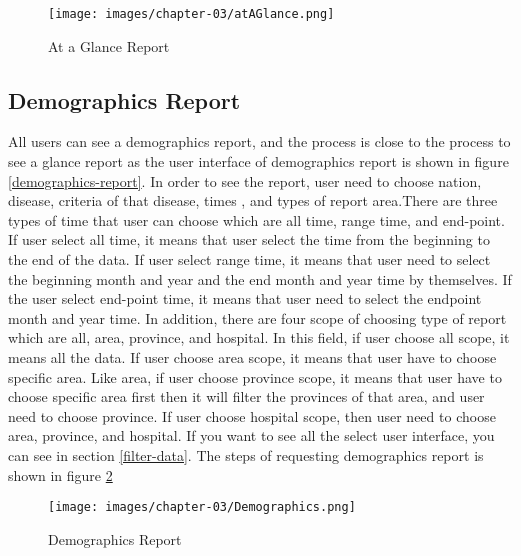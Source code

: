 	\FloatBarrier
    	\begin{figure}[h!]
            \centering
        		\texttt{[image: images/chapter-03/atAGlance.png]}
        		\caption{At a Glance Report}
        		\label{glance-report}
        \end{figure}
	\FloatBarrier
	
	\subsection{Demographics Report} \label{demographics_report_sec}
	All users can see a demographics report, and the process is close to the process to see a glance report as the user interface of demographics report is shown in figure \ref{demographics-report}. In order to see the report, user need to choose nation, disease, criteria of that disease, times , and types of report area.There are three types of time that user can choose which are all time, range time, and end-point. If user select all time, it means that user select the time from the beginning to the end of the data. If user select range time, it means that user need to select the beginning month and year and the end month and year time by themselves. If the user select end-point time, it means that user need to select the endpoint month and year time. In addition, there are four scope of choosing type of report which are all, area, province, and hospital. In this field, if user choose all scope, it means all the data. If user choose area scope, it means that user have to choose specific area. Like area, if user choose province scope, it means that user have to choose specific area first then it will filter the provinces of that area, and user need to choose province. If user choose hospital scope, then user need to choose area, province, and hospital. If you want to see all the select user interface, you can see in section \ref{filter-data}. The steps of requesting demographics report is shown in figure \ref{demographics}
	
	
	 \FloatBarrier
    	\begin{figure}[h!]
            \centering
        		\texttt{[image: images/chapter-03/Demographics.png]}
        		\caption{Demographics Report}
        		\label{demographics}
        \end{figure}
	\FloatBarrier
	
